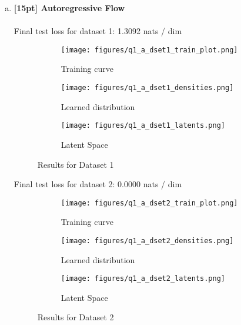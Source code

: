 \documentclass{article}
\begin{document}
\begin{enumerate}[(a)]

\item {\bf [15pt] Autoregressive Flow} \\\\
Final test loss for dataset 1: 1.3092 nats / dim
\begin{figure}[H]
    \centering
    \begin{subfigure}{0.32\textwidth}
        \centering
        \texttt{[image: figures/q1\_a\_dset1\_train\_plot.png]}
        \caption{Training curve}
    \end{subfigure}
    \begin{subfigure}{0.32\textwidth}
        \centering
        \texttt{[image: figures/q1\_a\_dset1\_densities.png]}
        \caption{Learned distribution}
    \end{subfigure}
    \begin{subfigure}{0.32\textwidth}
        \centering
        \texttt{[image: figures/q1\_a\_dset1\_latents.png]}
        \caption{Latent Space}
    \end{subfigure}
    \caption{Results for Dataset 1}
\end{figure}
Final test loss for dataset 2: 0.0000  nats / dim
\begin{figure}[H]
    \centering
    \begin{subfigure}{0.32\textwidth}
        \centering
        \texttt{[image: figures/q1\_a\_dset2\_train\_plot.png]}
        \caption{Training curve}
    \end{subfigure}
    \begin{subfigure}{0.32\textwidth}
        \centering
        \texttt{[image: figures/q1\_a\_dset2\_densities.png]}
        \caption{Learned distribution}
    \end{subfigure}
    \begin{subfigure}{0.32\textwidth}
        \centering
        \texttt{[image: figures/q1\_a\_dset2\_latents.png]}
        \caption{Latent Space}
    \end{subfigure}
    \caption{Results for Dataset 2}
\end{figure}

\newpage


\end{enumerate}
\end{document}
